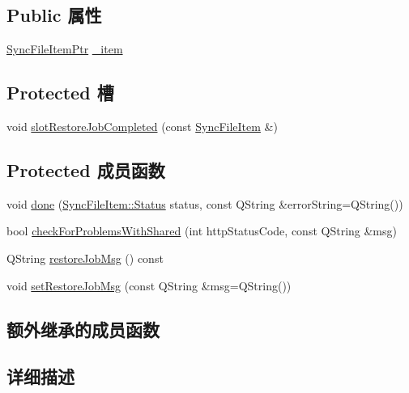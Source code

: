 \subsection*{Public 属性}
\begin{DoxyCompactItemize}
\item 
\hyperlink{namespace_o_c_c_acb6b0db82893659fbd0c98d3c5b8e2b8}{Sync\+File\+Item\+Ptr} \hyperlink{class_o_c_c_1_1_propagate_item_job_a3ea41be5747457782c94342f22a5857d}{\+\_\+item}
\end{DoxyCompactItemize}
\subsection*{Protected 槽}
\begin{DoxyCompactItemize}
\item 
void \hyperlink{class_o_c_c_1_1_propagate_item_job_a3f4983a7f077d7ed7f5ccf1145c5d340}{slot\+Restore\+Job\+Completed} (const \hyperlink{class_o_c_c_1_1_sync_file_item}{Sync\+File\+Item} \&)
\end{DoxyCompactItemize}
\subsection*{Protected 成员函数}
\begin{DoxyCompactItemize}
\item 
void \hyperlink{class_o_c_c_1_1_propagate_item_job_a0b9d2d0dca6a2ea928346e9615c9da74}{done} (\hyperlink{class_o_c_c_1_1_sync_file_item_a149ade86eddd9661587bfbc9bcbca408}{Sync\+File\+Item\+::\+Status} status, const Q\+String \&error\+String=Q\+String())
\item 
bool \hyperlink{class_o_c_c_1_1_propagate_item_job_a1be9643bf431843358a19ec23239a04b}{check\+For\+Problems\+With\+Shared} (int http\+Status\+Code, const Q\+String \&msg)
\item 
Q\+String \hyperlink{class_o_c_c_1_1_propagate_item_job_ac87c3a80a55803c1d54f95c31ab8c4d2}{restore\+Job\+Msg} () const
\item 
void \hyperlink{class_o_c_c_1_1_propagate_item_job_a535f51adf1f8cdd17f5f365bd9929c95}{set\+Restore\+Job\+Msg} (const Q\+String \&msg=Q\+String())
\end{DoxyCompactItemize}
\subsection*{额外继承的成员函数}


\subsection{详细描述}


